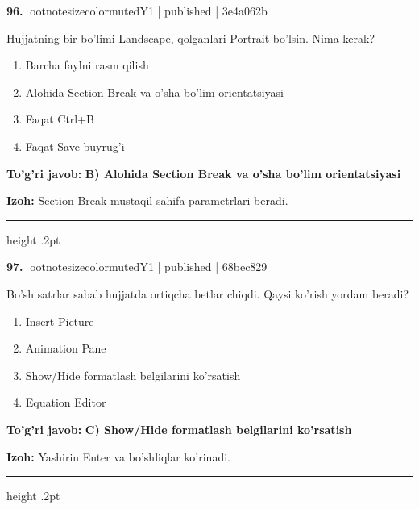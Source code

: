 \documentclass[10pt,a4paper]{article}
\begin{document}
\textbf{\color{ink}96.} {ootnotesizecolor{muted}Y1 | published | 3e4a062b}
\par
Hujjatning bir bo'limi Landscape, qolganlari Portrait bo'lsin. Nima kerak?
\begin{enumerate}[label=\Alph*),leftmargin=9mm]
\item Barcha faylni rasm qilish
\item Alohida Section Break va o'sha bo'lim orientatsiyasi
\item Faqat Ctrl+B
\item Faqat Save buyrug'i
\end{enumerate}
\begin{tcolorbox}[enhanced,breakable,colback=teal!4,colframe=teal!55!black,boxrule=0.45pt,arc=1.2mm,left=2.8mm,right=2.8mm,top=2mm,bottom=2mm]
\textbf{\color{teal}To'g'ri javob:} \textbf{B) Alohida Section Break va o'sha bo'lim orientatsiyasi}
\par\smallskip
\textbf{Izoh:} Section Break mustaqil sahifa parametrlari beradi.
\end{tcolorbox}
\vspace{2mm}\hrule height .2pt\vspace{2mm}

\textbf{\color{ink}97.} {ootnotesizecolor{muted}Y1 | published | 68bec829}
\par
Bo'sh satrlar sabab hujjatda ortiqcha betlar chiqdi. Qaysi ko'rish yordam beradi?
\begin{enumerate}[label=\Alph*),leftmargin=9mm]
\item Insert Picture
\item Animation Pane
\item Show/Hide formatlash belgilarini ko'rsatish
\item Equation Editor
\end{enumerate}
\begin{tcolorbox}[enhanced,breakable,colback=teal!4,colframe=teal!55!black,boxrule=0.45pt,arc=1.2mm,left=2.8mm,right=2.8mm,top=2mm,bottom=2mm]
\textbf{\color{teal}To'g'ri javob:} \textbf{C) Show/Hide formatlash belgilarini ko'rsatish}
\par\smallskip
\textbf{Izoh:} Yashirin Enter va bo'shliqlar ko'rinadi.
\end{tcolorbox}
\vspace{2mm}\hrule height .2pt\vspace{2mm}
\end{document}
